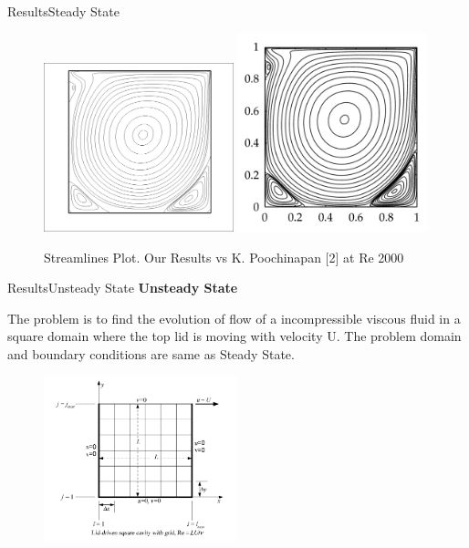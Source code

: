 \documentclass[11pt]{beamer}
\begin{document}
\begin{frame}{Results}{Steady State}
\begin{figure}
\includegraphics[width=0.49\textwidth]{images/steady/2000psi}
\includegraphics[width=0.49\textwidth]{images/steady/k2000psi}
\caption{Streamlines Plot. Our Results vs K. Poochinapan [2] at Re 2000}
\end{figure}
\end{frame}


\begin{frame}{Results}{Unsteady State}
\textbf{Unsteady State}\linebreak

The problem is to find the evolution of flow of a incompressible viscous fluid in a square domain where the top lid is moving with velocity U. The problem domain and boundary conditions are same as Steady State.
\begin{figure}
\includegraphics[width=0.5\textwidth]{images/steady/domain}
\end{figure}
\end{frame}
\end{document}
